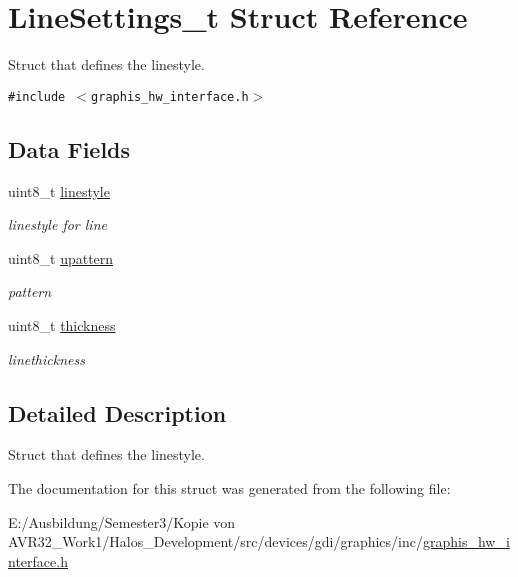 \hypertarget{struct_line_settings__t}{
\section{LineSettings\_\-t Struct Reference}
\label{struct_line_settings__t}
}
Struct that defines the linestyle.  


{\tt \#include $<$graphis\_\-hw\_\-interface.h$>$}

\subsection*{Data Fields}
\begin{CompactItemize}
\item 
\hypertarget{struct_line_settings__t_27efb6814de80d28b7960d393b334b59}{
uint8\_\-t \hyperlink{struct_line_settings__t_27efb6814de80d28b7960d393b334b59}{linestyle}}
\label{struct_line_settings__t_27efb6814de80d28b7960d393b334b59}

\begin{CompactList}\small\item\em linestyle for line \item\end{CompactList}\item 
\hypertarget{struct_line_settings__t_ff0408d73969e35342d800a9e500c638}{
uint8\_\-t \hyperlink{struct_line_settings__t_ff0408d73969e35342d800a9e500c638}{upattern}}
\label{struct_line_settings__t_ff0408d73969e35342d800a9e500c638}

\begin{CompactList}\small\item\em pattern \item\end{CompactList}\item 
\hypertarget{struct_line_settings__t_889ae907839c117021f51409ed219e46}{
uint8\_\-t \hyperlink{struct_line_settings__t_889ae907839c117021f51409ed219e46}{thickness}}
\label{struct_line_settings__t_889ae907839c117021f51409ed219e46}

\begin{CompactList}\small\item\em linethickness \item\end{CompactList}\end{CompactItemize}


\subsection{Detailed Description}
Struct that defines the linestyle. 

The documentation for this struct was generated from the following file:\begin{CompactItemize}
\item 
E:/Ausbildung/Semester3/Kopie von AVR32\_\-Work1/Halos\_\-Development/src/devices/gdi/graphics/inc/\hyperlink{graphis__hw__interface_8h}{graphis\_\-hw\_\-interface.h}\end{CompactItemize}
